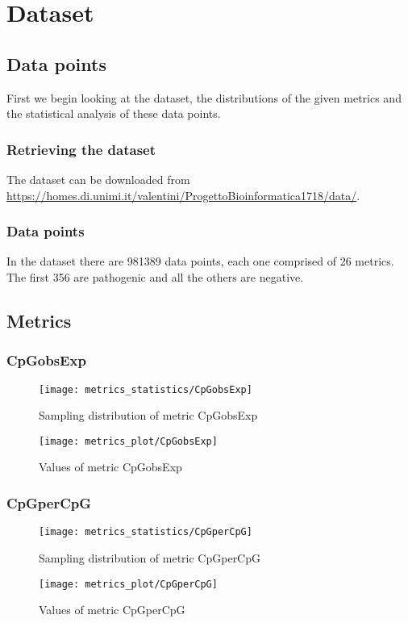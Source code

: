 \providecommand{\main}{.}








{\hypersetup{hidelinks}
  \tableofcontents  %
}
\part{Dataset}
\chapter{Data points}
First we begin looking at the dataset, the distributions of the given metrics and the statistical analysis of these data points.

\section{Retrieving the dataset}
The dataset can be downloaded from \url{https://homes.di.unimi.it/valentini/ProgettoBioinformatica1718/data/}.

\section{Data points}
In the dataset there are 981389 data points, each one comprised of 26 metrics. The first 356 are pathogenic and all the others are negative.

\chapter{Metrics}
\section{CpGobsExp}
\begin{figure}
  \texttt{[image: metrics\_statistics/CpGobsExp]}
  \caption{Sampling distribution of metric CpGobsExp}
\end{figure}
\begin{figure}
  \texttt{[image: metrics\_plot/CpGobsExp]}
  \caption{Values of metric CpGobsExp}
\end{figure}
\section{CpGperCpG}
\begin{figure}
  \texttt{[image: metrics\_statistics/CpGperCpG]}
  \caption{Sampling distribution of metric CpGperCpG}
\end{figure}
\begin{figure}
  \texttt{[image: metrics\_plot/CpGperCpG]}
  \caption{Values of metric CpGperCpG}
\end{figure}
